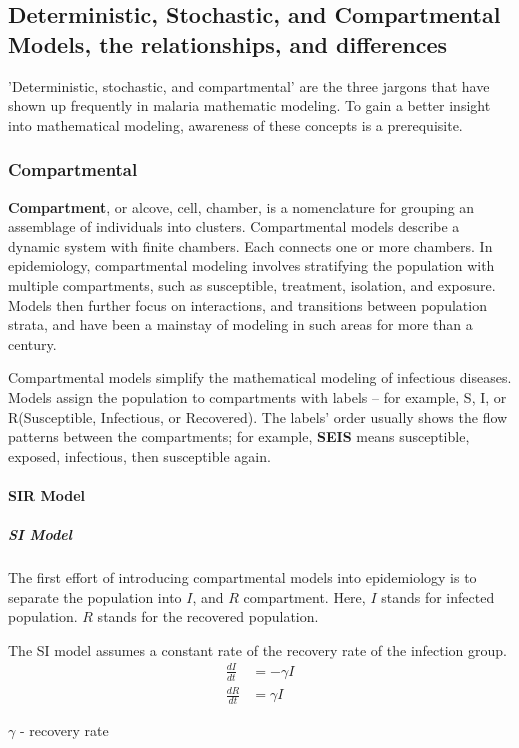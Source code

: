 \documentclass[a4paper, 12pt, twoside]{article}
\begin{document}
\subsection{Deterministic, Stochastic, and Compartmental Models, the relationships, and differences}
'Deterministic, stochastic, and compartmental' are the three jargons that have shown up frequently in malaria mathematic modeling.
To gain a better insight into mathematical modeling, awareness of these concepts is a prerequisite.

\subsubsection{Compartmental}%
\label{subsubsec:compartmental}
\textbf{Compartment}, or alcove, cell, chamber, is a nomenclature for grouping an assemblage of individuals into clusters.
Compartmental models describe a dynamic system with finite chambers.
Each connects one or more chambers.
In epidemiology, compartmental modeling involves stratifying the population with multiple compartments, such as susceptible, treatment, isolation, and exposure.
Models then further focus on interactions, and transitions between population strata, and have been a mainstay of modeling in such areas for more than a century.

Compartmental models simplify the mathematical modeling of infectious diseases.
Models assign the population to compartments with labels – for example, S, I, or R(Susceptible, Infectious, or Recovered).
The labels' order usually shows the flow patterns between the compartments; for example, \textbf{SEIS} means susceptible, exposed, infectious, then susceptible again.

\paragraph{SIR Model}
\subparagraph{SI Model}
The first effort of introducing compartmental models into epidemiology is to separate the population into $I$, and $R$ compartment.
Here, $I$ stands for infected population.
$R$ stands for the recovered population.

The SI model assumes a constant rate of the recovery rate of the infection group.
\begin{align}
	\frac{dI}{dt} & = - \gamma I \\
	\frac{dR}{dt} & = \gamma I
\end{align}

\begin{center}
$\gamma$ - recovery rate
\end{center}
\end{document}
